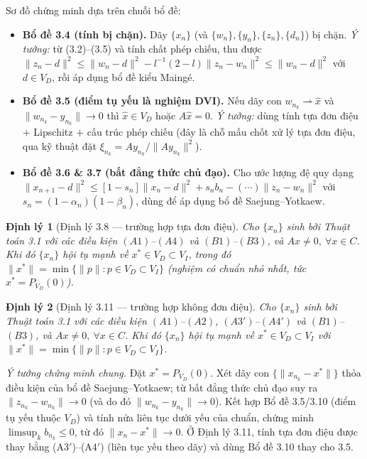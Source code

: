 \documentclass{MyBook}
\theoremstyle{plain}
\newtheorem{theorem}{Định lý}
\theoremstyle{definition}
\newcommand{\nm}[1]{\lVert #1\rVert}
\newcommand{\wto}{\rightharpoonup}
\begin{document}
Sơ đồ chứng minh dựa trên chuỗi bổ đề:
\begin{itemize}[leftmargin=1.4em,itemsep=1pt]
\item \textbf{Bổ đề 3.4 (tính bị chặn).} Dãy $\{x_n\}$ (và $\{w_n\},\{y_n\},\{z_n\},\{d_n\}$) bị chặn. \emph{Ý tưởng:} từ (3.2)--(3.5) và tính chất phép chiếu, thu được $\nm{z_n-d}^2\le\nm{w_n-d}^2-l^{-1}(2-l)\nm{z_n-w_n}^2\le\nm{w_n-d}^2$ với $d\in V_D$, rồi áp dụng bổ đề kiểu Maingé.
\item \textbf{Bổ đề 3.5 (điểm tụ yếu là nghiệm DVI).} Nếu dãy con $w_{n_k}\wto\hat{x}$ và $\nm{w_{n_k}-y_{n_k}}\to0$ thì $\hat{x}\in V_D$ hoặc $A\hat{x}=0$. \emph{Ý tưởng:} dùng tính tựa đơn điệu $+$ Lipschitz $+$ cấu trúc phép chiếu (đây là chỗ mấu chốt xử lý tựa đơn điệu, qua kỹ thuật đặt $\xi_{n_k}=Ay_{n_k}/\nm{Ay_{n_k}}^2$).
\item \textbf{Bổ đề 3.6 \& 3.7 (bất đẳng thức chủ đạo).} Cho ước lượng đệ quy dạng $\nm{x_{n+1}-d}^2\le[1-s_n]\nm{x_n-d}^2+s_n b_n-(\cdots)\nm{z_n-w_n}^2$ với $s_n=(1-\alpha_n)(1-\beta_n)$, dùng để áp dụng bổ đề Saejung--Yotkaew.
\end{itemize}

\begin{theorem}[Định lý 3.8 --- trường hợp tựa đơn điệu]
Cho $\{x_n\}$ sinh bởi Thuật toán 3.1 với các điều kiện $(A1)$--$(A4)$ và $(B1)$--$(B3)$, và $Ax\ne 0,\ \forall x\in C$. Khi đó $\{x_n\}$ hội tụ mạnh về $x^{*}\in V_D\subset V_I$, trong đó $\nm{x^{*}}=\min\{\nm{p}:p\in V_D\subset V_I\}$ (nghiệm có chuẩn nhỏ nhất, tức $x^{*}=P_{V_D}(0)$).
\end{theorem}

\begin{theorem}[Định lý 3.11 --- trường hợp không đơn điệu]
Cho $\{x_n\}$ sinh bởi Thuật toán 3.1 với các điều kiện $(A1)$--$(A2)$, $(A3')$--$(A4')$ và $(B1)$--$(B3)$, và $Ax\ne 0,\ \forall x\in C$. Khi đó $\{x_n\}$ hội tụ mạnh về $x^{*}\in V_D\subset V_I$ với $\nm{x^{*}}=\min\{\nm{p}:p\in V_D\subset V_I\}$.
\end{theorem}

\noindent\emph{Ý tưởng chứng minh chung.} Đặt $x^{*}=P_{V_D}(0)$. Xét dãy con $\{\nm{x_{n_k}-x^{*}}\}$ thỏa điều kiện của bổ đề Saejung--Yotkaew; từ bất đẳng thức chủ đạo suy ra $\nm{z_{n_k}-w_{n_k}}\to0$ (và do đó $\nm{w_{n_k}-y_{n_k}}\to0$). Kết hợp Bổ đề 3.5/3.10 (điểm tụ yếu thuộc $V_D$) và tính nửa liên tục dưới yếu của chuẩn, chứng minh $\limsup_k b_{n_k}\le0$, từ đó $\nm{x_n-x^{*}}\to0$. Ở Định lý 3.11, tính tựa đơn điệu được thay bằng (A3$'$)--(A4$'$) (liên tục yếu theo dãy) và dùng Bổ đề 3.10 thay cho 3.5.
\end{document}
